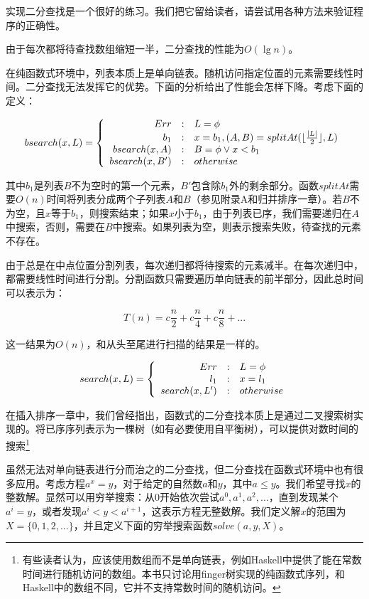 \documentclass[UTF8]{article}
\begin{document}
实现二分查找是一个很好的练习。我们把它留给读者，请尝试用各种方法来验证程序的正确性。

由于每次都将待查找数组缩短一半，二分查找的性能为$O(\lg n)$。

在纯函数式环境中，列表本质上是单向链表。随机访问指定位置的元素需要线性时间。二分查找无法发挥它的优势。下面的分析给出了性能会怎样下降。考虑下面的定义：

\[
bsearch(x, L) = \left \{
  \begin{array}
  {r@{\quad:\quad}l}
  Err & L = \phi \\
  b_1 & x = b_1, (A, B) = splitAt(\lfloor \frac{|L|}{2} \rfloor, L) \\
  bsearch(x, A) & B = \phi \lor x < b_1 \\
  bsearch(x, B') & otherwise
  \end{array}
\right.
\]

其中$b_1$是列表$B$不为空时的第一个元素，$B'$包含除$b_1$外的剩余部分。函数$splitAt$需要$O(n)$时间将列表分成两个子列表$A$和$B$（参见附录A和归并排序一章）。若$B$不为空，且$x$等于$b_1$，则搜索结束；如果$x$小于$b_1$，由于列表已序，我们需要递归在$A$中搜索，否则，需要在$B$中搜索。如果列表为空，则表示搜索失败，待查找的元素不存在。

由于总是在中点位置分割列表，每次递归都将待搜索的元素减半。在每次递归中，都需要线性时间进行分割。分割函数只需要遍历单向链表的前半部分，因此总时间可以表示为：

\[
T(n) = c \frac{n}{2} + c \frac{n}{4} + c \frac{n}{8} + ...
\]

这一结果为$O(n)$，和从头至尾进行扫描的结果是一样的。

\[
search(x, L) = \left \{
  \begin{array}
  {r@{\quad:\quad}l}
  Err & L = \phi \\
  l_1 & x = l_1 \\
  search(x, L') & otherwise
  \end{array}
\right.
\]

在插入排序一章中，我们曾经指出，函数式的二分查找本质上是通过二叉搜索树实现的。将已序序列表示为一棵树（如有必要使用自平衡树），可以提供对数时间的搜索\footnote{有些读者认为，应该使用数组而不是单向链表，例如Haskell中提供了能在常数时间进行随机访问的数组。本书只讨论用finger树实现的纯函数式序列，和Haskell中的数组不同，它并不支持常数时间的随机访问。}

虽然无法对单向链表进行分而治之的二分查找，但二分查找在函数式环境中也有很多应用。考虑方程$a^x = y$，对于给定的自然数$a$和$y$，其中$a \leq y$。我们希望寻找$x$的整数解。显然可以用穷举搜索：从0开始依次尝试$a^0, a^1, a^2, ...$，直到发现某个$a^i = y$，或者发现$a^i < y < a^{i+1}$，这表示方程无整数解。我们定义解$x$的范围为$X = \{0, 1, 2, ...\}$，并且定义下面的穷举搜索函数$solve(a, y, X)$。
\end{document}
